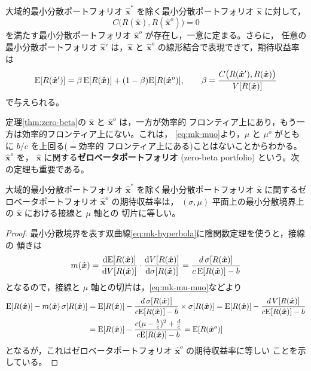 \begin{theorem}
大域的最小分散ポートフォリオ $\hat{\bm{x}}^*$ を除く最小分散ポートフォリオ
$\hat{\bm{x}}$ に対して，
\begin{equation}
C\bigl(R(\hat{\bm{x}}), R(\hat{\bm{x}}^o)\bigr) = 0
\end{equation}
を満たす最小分散ポートフォリオ $\hat{\bm{x}}^o$ が存在し，一意に定まる。さらに，
任意の最小分散ポートフォリオ $\hat{\bm{x}}'$ は，$\hat{\bm{x}}$ と
$\hat{\bm{x}}^o$ の線形結合で表現できて，期待収益率は
\begin{equation}
\mathrm{E}[R(\hat{\bm{x}}')] = \beta\,\mathrm{E}[R(\hat{\bm{x}})] + (1-\beta)\mathrm{E}[R(\hat{\bm{x}}^o)],
\qquad
\beta = \frac{C\bigl(R(\hat{\bm{x}}'),R(\hat{\bm{x}})\bigr)}{V[R(\hat{\bm{x}})]}
\end{equation}
で与えられる。
\label{thm:zero-beta}
\end{theorem}

定理\ref{thm:zero-beta}の $\hat{\bm{x}}$ と $\hat{\bm{x}}^o$ は，一方が効率的
フロンティア上にあり，もう一方は効率的フロンティア上にない。これは，
\eqref{eq:mk-muo}より，$\mu$ と $\mu^o$ がともに $b/c$ を上回る($=$効率的
フロンティア上にある)ことはないことからわかる。$\hat{\bm{x}}^o$ を，
$\hat{\bm{x}}$ に関する\textbf{ゼロベータポートフォリオ} (zero-beta portfolio)
という。次の定理も重要である。

\begin{theorem}
大域的最小分散ポートフォリオ $\hat{\bm{x}}^*$ を除く最小分散ポートフォリオ
$\hat{\bm{x}}$ に関するゼロベータポートフォリオ $\hat{\bm{x}}^o$ の期待収益率は，
$(\sigma,\mu)$ 平面上の最小分散境界上の $\hat{\bm{x}}$ における接線と $\mu$ 軸との
切片に等しい。
\label{thm:zero-beta-tangent}
\end{theorem}

\begin{proof}
最小分散境界を表す双曲線\eqref{eq:mk-hyperbola}に陰関数定理を使うと，接線の
傾きは
\begin{equation}
m(\hat{\bm{x}}) = \frac{\mathrm{d} \mathrm{E}[R(\hat{\bm{x}})]}{\mathrm{d} V[R(\hat{\bm{x}})]}
\cdot\frac{\mathrm{d} V[R(\hat{\bm{x}})]}{\mathrm{d}\sigma[R(\hat{\bm{x}})]}
= \frac{d\,\sigma[R(\hat{\bm{x}})]}{c\,\mathrm{E}[R(\hat{\bm{x}})] - b}
\end{equation}
となるので，接線と $\mu$ 軸との切片は，\eqref{eq:mk-mu-muo}などより
\begin{align}
\mathrm{E}[R(\hat{\bm{x}})] - m(\hat{\bm{x}})\,\sigma[R(\hat{\bm{x}})]
&= \mathrm{E}[R(\hat{\bm{x}})] - \frac{d\,\sigma[R(\hat{\bm{x}})]}
{c\mathrm{E}[R(\hat{\bm{x}})]-b}\times\sigma[R(\hat{\bm{x}})]
= \mathrm{E}[R(\hat{\bm{x}})] - \frac{d\,V[R(\hat{\bm{x}})]}{c\mathrm{E}[R(\hat{\bm{x}})]-b}\notag\\
&= \mathrm{E}[R(\hat{\bm{x}})] - \frac{c(\mu-\frac{b}{c})^2 + \frac{d}{c}}
{c\mathrm{E}[R(\hat{\bm{x}})]-b}
= \mathrm{E}[R(\hat{\bm{x}}^o)]
\end{align}
となるが，これはゼロベータポートフォリオ $\hat{\bm{x}}^o$ の期待収益率に等しい
ことを示している。
\end{proof}

